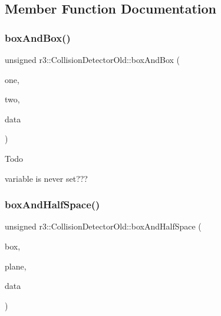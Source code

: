 \subsection{Member Function Documentation}
\mbox{\label{classr3_1_1_collision_detector_old_afd98d9fbaa8ace5bb239a2a2da08aace}} 
\subsubsection{\texorpdfstring{box\+And\+Box()}{boxAndBox()}}
{\footnotesize\ttfamily unsigned r3\+::\+Collision\+Detector\+Old\+::box\+And\+Box (\begin{DoxyParamCaption}\item[{const \mbox{\hyperlink{classr3_1_1_collision_box}{Collision\+Box}} \&}]{one,  }\item[{const \mbox{\hyperlink{classr3_1_1_collision_box}{Collision\+Box}} \&}]{two,  }\item[{\mbox{\hyperlink{classr3_1_1_collision_data_old}{Collision\+Data\+Old}} $\ast$}]{data }\end{DoxyParamCaption})\hspace{0.3cm}{\ttfamily [static]}}

\begin{DoxyRefDesc}{Todo}
\item[\mbox{\hyperlink{todo__todo000006}{Todo}}]variable is never set??? \end{DoxyRefDesc}
\mbox{\label{classr3_1_1_collision_detector_old_ad1fa9c247235130c96432fc3f5524e8f}} 
\subsubsection{\texorpdfstring{box\+And\+Half\+Space()}{boxAndHalfSpace()}}
{\footnotesize\ttfamily unsigned r3\+::\+Collision\+Detector\+Old\+::box\+And\+Half\+Space (\begin{DoxyParamCaption}\item[{const \mbox{\hyperlink{classr3_1_1_collision_box}{Collision\+Box}} \&}]{box,  }\item[{const \mbox{\hyperlink{classr3_1_1_collision_plane}{Collision\+Plane}} \&}]{plane,  }\item[{\mbox{\hyperlink{classr3_1_1_collision_data_old}{Collision\+Data\+Old}} $\ast$}]{data }\end{DoxyParamCaption})\hspace{0.3cm}{\ttfamily [static]}}

